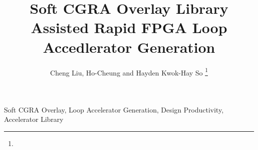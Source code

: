 \documentclass[journal]{IEEEtran}
\begin{document}
\title{Soft CGRA Overlay Library Assisted Rapid FPGA Loop Accedlerator Generation}
\author{Cheng Liu, Ho-Cheung and Hayden Kwok-Hay So%
\thanks{}
}
\maketitle

\begin{abstract}
    
\end{abstract}

\begin{IEEEkeywords}
Soft CGRA Overlay, Loop Accelerator Generation, Design Productivity, Accelerator Library
\end{IEEEkeywords}










\end{document}
